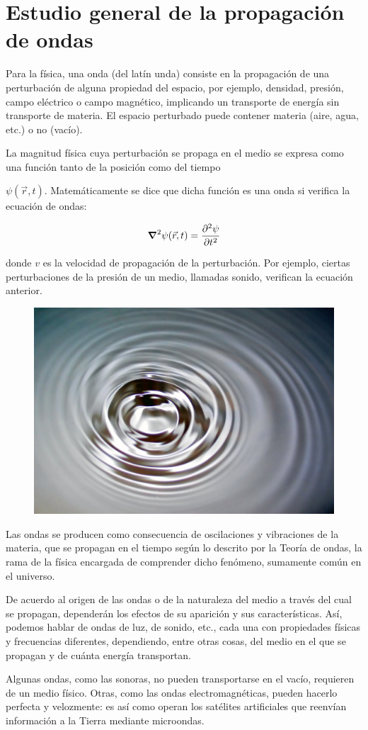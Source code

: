 \chapter{Estudio general de la propagación de ondas}

\begin{miparrafo}
Para la física, una onda (del latín unda) consiste en la propagación de una perturbación de alguna propiedad del espacio, por ejemplo, densidad, presión, campo eléctrico o campo magnético, implicando un transporte de energía sin transporte de materia. El espacio perturbado puede contener materia (aire, agua, etc.) o no (vacío).

La magnitud física cuya perturbación se propaga en el medio se expresa como una función tanto de la posición como del tiempo 

$\psi ({\vec  {r}},t)$. Matemáticamente se dice que dicha función es una onda si verifica la ecuación de ondas:

$$\displaystyle \grad^2 \psi (\vec r ,t)= \pdv[2]{\psi}{t}(\vec r ,t)$$

donde $v$ es la velocidad de propagación de la perturbación. Por ejemplo, ciertas perturbaciones de la presión de un medio, llamadas sonido, verifican la ecuación anterior.

\begin{figure}[H]
		\centering
		\includegraphics[width=.75\textwidth]{imagenes/imagenes21/T21IM01.png}
	\end{figure}

Las ondas se producen como consecuencia de oscilaciones y vibraciones de la materia, que se propagan en el tiempo según lo descrito por la Teoría de ondas, la rama de la física encargada de comprender dicho fenómeno, sumamente común en el universo.

De acuerdo al origen de las ondas o de la naturaleza del medio a través del cual se propagan, dependerán los efectos de su aparición y sus características. Así, podemos hablar de ondas de luz, de sonido, etc., cada una con propiedades físicas y frecuencias diferentes, dependiendo, entre otras cosas, del medio en el que se propagan y de cuánta energía transportan.

Algunas ondas, como las sonoras, no pueden transportarse en el vacío, requieren de un medio físico. Otras, como las ondas electromagnéticas, pueden hacerlo perfecta y velozmente: es así como operan los satélites artificiales que reenvían información a la Tierra mediante microondas.
\end{miparrafo}

